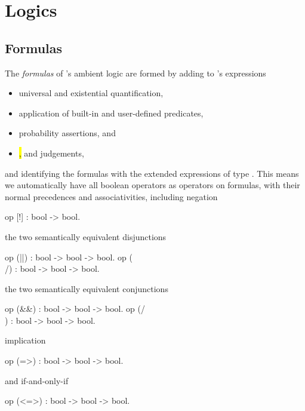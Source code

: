\section{Logics}

\subsection{Formulas}

The \emph{formulas} of \EasyCrypt's ambient logic are formed by
adding to \EasyCrypt's expressions
\begin{itemize}
\item universal and existential quantification,

\item application of built-in and user-defined predicates,

\item probability assertions, and

\item \hl, \phl and \prhl judgements,
\end{itemize}
and identifying the formulas with the extended expressions of type
.
This means we automatically have all boolean operators as operators on
formulas, with their normal precedences and associativities, including
negation
\begin{easycrypt}{}{}
op [!] : bool -> bool.
\end{easycrypt}
the two semantically equivalent disjunctions
\begin{easycrypt}{}{}
op (||) : bool -> bool -> bool.
op (\\/) : bool -> bool -> bool.
\end{easycrypt}
the two semantically equivalent conjunctions
\begin{easycrypt}{}{}
op (&&) : bool -> bool -> bool.
op (/\\) : bool -> bool -> bool.
\end{easycrypt}
implication
\begin{easycrypt}{}{}
op (=>) : bool -> bool -> bool.
\end{easycrypt}
and if-and-only-if
\begin{easycrypt}{}{}
op (<=>) : bool -> bool -> bool.
\end{easycrypt}

